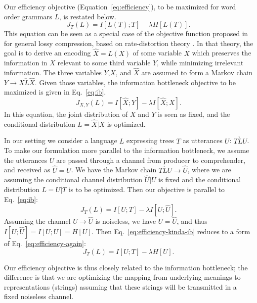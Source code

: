\documentclass[10pt,twoside,lineno]{article}
\begin{document}
Our efficiency objective (Equation~\ref{eq:efficiency}), to be maximized for word order grammars $L$, is restated below.
\begin{equation}
    \label{eq:efficiency-again}
    J_T(L) = I[L(T); T] - \lambda H[L(T)].
\end{equation}
This equation can be seen as a special case of the objective function proposed in \citet{tishby1999information} for general lossy compression, based on rate-distortion theory \citep{cover2006elements,harremoes2007information}. In that theory, the goal is to derive an encoding $\hat{X}=L(X)$ of some variable $X$ which preserves the information in $X$ relevant to some third variable $Y$, while minimizing irrelevant information. The three variables $Y$,$X$, and $\hat{X}$ are assumed to form a Markov chain $Y \rightarrow X \underrightarrow{L} \hat{X}$. Given those variables, the information bottleneck objective to be maximized is given in Eq.~\ref{eq:ib}.
\begin{equation}
    \label{eq:ib}
    J_{X,Y}(L) = I[\hat{X}; Y] - \lambda I[\hat{X}; X].
\end{equation}
In this equation, the joint distribution of $X$ and $Y$ is seen as fixed, and the conditional distribution $L=\hat{X}|X$ is optimized.

In our setting we consider a language $L$ expressing trees $T$ as utterances $U$: $T \underrightarrow{L} U$. To make our formulation more parallel to the information bottleneck, we assume the utterances $U$ are passed through a channel from producer to comprehender, and received as $\hat{U}=U$. We have the Markov chain $T \underrightarrow{L} U \rightarrow \hat{U}$, where we are assuming the conditional channel distribution $\hat{U}|U$ is fixed and the conditional distribution $L=U|T$ is to be optimized. Then our objective is parallel to Eq.~\ref{eq:ib}:
\begin{equation}
    \label{eq:efficiency-kinda-ib}
    J_T(L) = I[U;T] - \lambda I[U;\hat{U}]. %
\end{equation}
Assuming the channel $U \rightarrow \hat{U}$ is noiseless, we have $U=\hat{U}$, and thus $I[U;\hat{U}]=I[U;U] = H[U]$. Then Eq.~\ref{eq:efficiency-kinda-ib} reduces to a form of Eq.~\ref{eq:efficiency-again}:
\begin{equation*}
    J_T(L) = I[U;T] - \lambda H[U].
\end{equation*}

Our efficiency objective is thus closely related to the information bottleneck; the difference is that we are optimizing the mapping from underlying meanings to representations (strings) assuming that these strings will be transmitted in a fixed noiseless channel.



\end{document}
